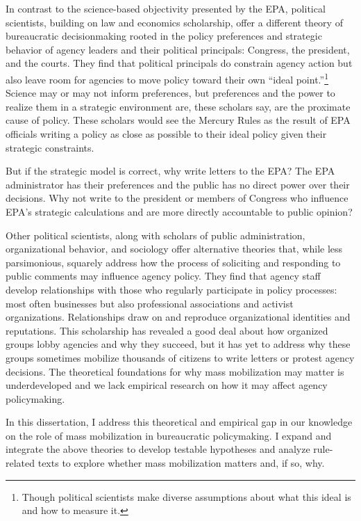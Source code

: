 In contrast to the science-based objectivity presented by the EPA, political scientists, building on law and economics scholarship, offer a different theory of bureaucratic decisionmaking rooted in the policy preferences and strategic behavior of agency leaders and their political principals: Congress, the president, and the courts. They find that political principals do constrain agency action but also leave room for agencies to move policy toward their own ``ideal point.''\footnote{Though political scientists make diverse assumptions about what this ideal is and how to measure it.} Science may or may not inform preferences, but preferences and the power to realize them in a strategic environment are, these scholars say, are the proximate cause of policy. These scholars would see the Mercury Rules as the result of EPA officials writing a policy as close as possible to their ideal policy given their strategic constraints. 

But if the strategic model is correct, why write letters to the EPA? The EPA administrator has their preferences and the public has no direct power over their decisions. Why not write to the president or members of Congress who influence EPA's strategic calculations and are more directly accountable to public opinion? 

Other political scientists, along with scholars of public administration, organizational behavior, and sociology offer alternative theories that, while less parsimonious, squarely address how the process of soliciting and responding to public comments may influence agency policy. They find that agency staff develop relationships with those who regularly participate in policy processes: most often businesses but also professional associations and activist organizations. Relationships draw on and reproduce organizational identities and reputations. This scholarship has revealed a good deal about how organized groups lobby agencies and why they succeed, but it has yet to address why these groups sometimes mobilize thousands of citizens to write letters or protest agency decisions. The theoretical foundations for why mass mobilization may matter is underdeveloped and we lack empirical research on how it may affect agency policymaking. 

In this dissertation, 
I address this theoretical and empirical gap in our knowledge on the role of mass mobilization in bureaucratic policymaking. I expand and integrate the above theories to develop testable hypotheses and analyze rule-related texts %
to explore whether mass mobilization matters and, if so, why. 

